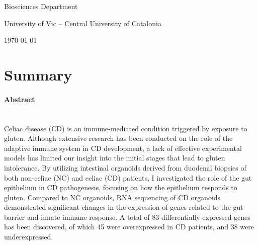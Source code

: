 \documentclass[12pt]{article}
\begin{document}
\begin{titlepage}
\begin{center}
\vspace{1cm}

\large{Biosciences Department}


\vspace{0.5cm}

\large{University of Vic – Central University of Catalonia}

\vspace{0.5cm}

\large{\today}

\end{center}
\end{titlepage}
\restoregeometry


\pagestyle{myfancy}

\tableofcontents  %

\restoregeometry

\section{Summary}
\paragraph{\large \textbf{Abstract}}\mbox{} \\

\noindent Celiac disease (CD) is an immune-mediated condition triggered by exposure to gluten. Although extensive research has been conducted on the role of the adaptive immune system in CD development, a lack of effective experimental models has limited our insight into the initial stages that lead to gluten intolerance. By utilizing intestinal organoids derived from duodenal biopsies of both non-celiac (NC) and celiac (CD) patients, I investigated the role of the gut epithelium in CD pathogenesis, focusing on how the epithelium responds to gluten. Compared to NC organoids, RNA sequencing of CD organoids demonstrated significant changes in the expression of genes related to the gut barrier and innate immune response. A total of 83 differentially expressed genes has been discovered, of which 45 were overexpressed in CD patients, and 38 were underexpressed.
\end{document}
